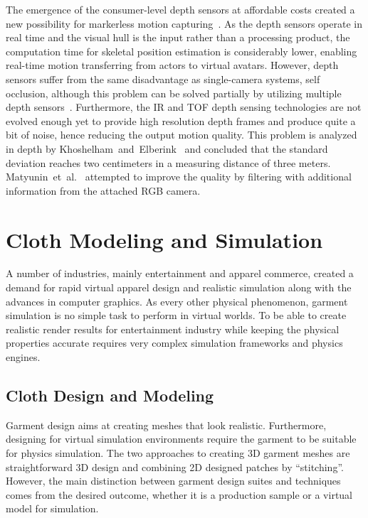 The emergence of the consumer-level depth sensors at affordable costs created a new possibility for markerless motion capturing~\cite{Dutta2012}. As the depth sensors operate in real time  and the visual hull is the input rather than a processing product, the computation time for skeletal position estimation is considerably lower, enabling  real-time motion transferring from actors to virtual avatars. However, depth sensors suffer from the same disadvantage as single-camera systems, self occlusion, although this problem can be solved partially by utilizing multiple depth sensors~\cite{Berger2011}. Furthermore, the IR and TOF depth sensing technologies are not evolved enough yet to provide high resolution depth frames and produce quite a bit of noise, hence reducing the output motion quality. This problem is analyzed in depth by Khoshelham~and~Elberink~\cite{Khoshelham2012} and concluded that the standard deviation reaches two centimeters in a measuring distance of three meters. Matyunin~et~al.~\cite{Matyunin2011} attempted to improve the 
quality by filtering with additional information from the attached RGB camera.   
 
\section{Cloth Modeling and Simulation}
 
A number of industries, mainly entertainment and apparel commerce, created a demand for rapid virtual apparel design and realistic simulation along with the advances in computer graphics. As every other physical phenomenon, garment simulation is no simple task to perform in virtual worlds. To be able to create realistic render results for entertainment industry while keeping the physical properties accurate requires very complex simulation frameworks and physics engines. 
 
\subsection{Cloth Design and Modeling}
 
Garment design aims at creating meshes that look realistic. Furthermore, designing for virtual simulation environments require the garment to be suitable for physics simulation. The two approaches to creating 3D garment meshes are straightforward 3D design and combining 2D designed patches by ``stitching''. However, the main distinction between garment design suites and techniques comes from the desired outcome, whether it is a production sample or a virtual model for simulation.
 
